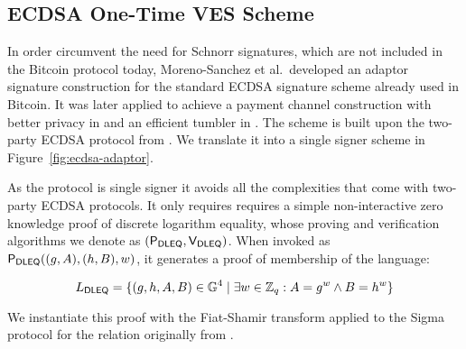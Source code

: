 \documentclass[fullpage]{article}
\theoremstyle{definition}
\newcommand{\G}{\mathbb{G}}
\begin{document}
\subsection{ECDSA One-Time VES Scheme}
\label{ecdsa-ot-ves-section}

\newcommand{\Pdleq}{\pcalgostyle{P}_{\textsf{DLEQ}}}
\newcommand{\Vdleq}{\pcalgostyle{V}_{\textsf{DLEQ}}}

In order circumvent the need for Schnorr signatures, which are not included in the Bitcoin protocol today, Moreno-Sanchez et al.\  developed an adaptor signature construction for the standard ECDSA signature scheme already used in Bitcoin\cite{ecdsa-scriptless-scripts}. It was later applied to achieve a payment channel construction with better privacy in \cite{cryptoeprint:2018:472} and an efficient tumbler in \cite{cryptoeprint:2019:589}. The scheme is built upon the two-party ECDSA protocol from \cite{Lindell2pECDSA}. We translate it into a single signer scheme in Figure~\ref{fig:ecdsa-adaptor}.

As the protocol is single signer it avoids all the complexities that come with two-party ECDSA protocols. It only requires requires a simple non-interactive zero knowledge proof of discrete logarithm equality, whose proving and verification algorithms we denote as $(\Pdleq,\Vdleq)$. When invoked as $\Pdleq((g, A),(h,B),w)$, it generates a proof of membership of the language:

\newcommand{\DLEQ}{\textsf{DLEQ}\xspace}
\[ L_{\DLEQ} = \{ (g, h, A, B) \in \G^4 \mid  \exists w \in \ZZ_q : A = g^w \land B = h^w \} \]

We instantiate this proof with the Fiat-Shamir transform applied to the Sigma protocol for the relation originally from \cite{dleq-proof}.

\newcommand{\Rx}{R_\texttt{x}}
\newcommand{\hatRx}{\hat{R}_\texttt{x}}
\newcommand{\xcoord}{f}
\end{document}
